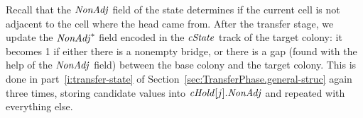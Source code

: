 \documentclass[12pt]{memoir}
\newcommand{\fld}[1]{\ensuremath{\textit{#1\/}}}
\newcommand{\Addr}{\fld{Addr}}
\newcommand{\cAddr}{\fld{cAddr}}
\newcommand{\Dir}{\fld{Dir}}
\newcommand{\cDrift}{\fld{cDrift}}
\newcommand{\NonAdj}{\fld{NonAdj}}
\newcommand{\cHold}{\fld{cHold}}
\newcommand{\Kind}{\fld{Kind}}
\newcommand{\cKind}{\fld{cKind}}
\newcommand{\cState}{\fld{cState}}
\newcommand{\Sweep}{\fld{Sw}}
\newcommand{\Member}{\mathrm{Member}}
\newcommand{\Target}{\mathrm{Target}}
\begin{document}





Recall that the \( \NonAdj \) field of the state determines
if the current cell is not adjacent to the cell  where the head came from.
After the transfer stage, we update the \( \NonAdj^{*} \) field encoded in the
\( \cState \) track of the target colony: it becomes 1 if either there is a nonempty bridge,
or there is a gap (found with the help of the \( \NonAdj \) field) between the base colony
and the target colony.
This is done in part~\ref{i:transfer-state} 
of Section~\ref{sec:TransferPhase.general-struc}
again three times, storing candidate values into \( \cHold[j].\NonAdj \)
and repeated with everything else.




\end{document}
